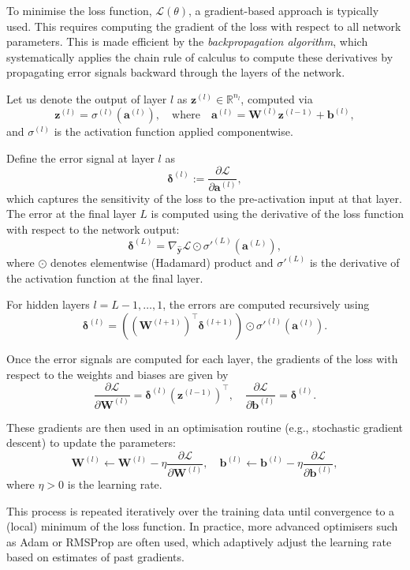 To minimise the loss function, \( \mathcal{L}(\theta) \), a gradient-based approach 
is typically used. This requires computing the gradient of the loss with respect to all network 
parameters. This is made efficient by the \emph{backpropagation algorithm}, which systematically 
applies the chain rule of calculus to compute these derivatives by propagating error signals backward 
through the layers of the network.

Let us denote the output of layer \( l \) as \( \mathbf{z}^{(l)} \in \mathbb{R}^{n_l} \), computed via
\[
    \mathbf{z}^{(l)} = \sigma^{(l)}\left( \mathbf{a}^{(l)} \right), \quad \text{where} \quad \mathbf{a}^{(l)} = \mathbf{W}^{(l)} \mathbf{z}^{(l-1)} + \mathbf{b}^{(l)},
\]
and \( \sigma^{(l)} \) is the activation function applied componentwise.

Define the error signal at layer \( l \) as
\[
    \boldsymbol{\delta}^{(l)} := \frac{\partial \mathcal{L}}{\partial \mathbf{a}^{(l)}},
\]
which captures the sensitivity of the loss to the pre-activation input at that layer. The error at the final layer \( L \) is computed using the derivative of the loss function with respect to the network output:
\[
    \boldsymbol{\delta}^{(L)} = \nabla_{\hat{\mathbf{y}}} \mathcal{L} \odot \sigma'^{(L)}\left( \mathbf{a}^{(L)} \right),
\]
where \( \odot \) denotes elementwise (Hadamard) product and \( \sigma'^{(L)} \) is the derivative of the activation function at the final layer.

For hidden layers \( l = L-1, \dots, 1 \), the errors are computed recursively using
\[
    \boldsymbol{\delta}^{(l)} = \left( (\mathbf{W}^{(l+1)})^\top \boldsymbol{\delta}^{(l+1)} \right) \odot \sigma'^{(l)}\left( \mathbf{a}^{(l)} \right).
\]

Once the error signals are computed for each layer, the gradients of the loss with respect to the weights and biases are given by
\[
    \frac{\partial \mathcal{L}}{\partial \mathbf{W}^{(l)}} = \boldsymbol{\delta}^{(l)} (\mathbf{z}^{(l-1)})^\top, \quad
    \frac{\partial \mathcal{L}}{\partial \mathbf{b}^{(l)}} = \boldsymbol{\delta}^{(l)}.
\]

These gradients are then used in an optimisation routine (e.g., stochastic gradient descent) to update the parameters:
\[
    \mathbf{W}^{(l)} \leftarrow \mathbf{W}^{(l)} - \eta \frac{\partial \mathcal{L}}{\partial \mathbf{W}^{(l)}}, \quad
    \mathbf{b}^{(l)} \leftarrow \mathbf{b}^{(l)} - \eta \frac{\partial \mathcal{L}}{\partial \mathbf{b}^{(l)}},
\]
where \( \eta > 0 \) is the learning rate.

This process is repeated iteratively over the training data until convergence to a (local) minimum of the loss function. In practice, more advanced optimisers such as Adam or RMSProp are often used, which adaptively adjust the learning rate based on estimates of past gradients.
